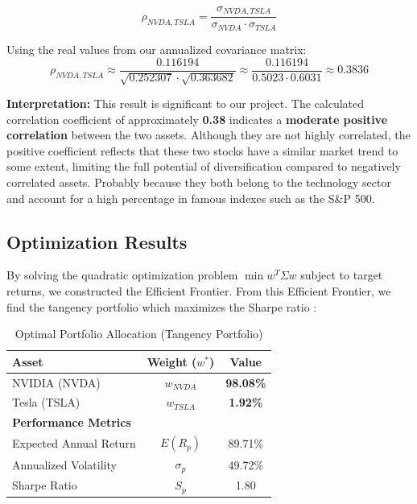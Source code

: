 \documentclass[12pt]{article}
\begin{document}
\[
\rho_{NVDA, TSLA} = \frac{\sigma_{NVDA, TSLA}}{\sigma_{NVDA} \cdot \sigma_{TSLA}}
\]

Using the real values from our annualized covariance matrix:
\[
\rho_{NVDA, TSLA} \approx \frac{0.116194}{\sqrt{0.252307} \cdot \sqrt{0.363682}} \approx \frac{0.116194}{0.5023 \cdot 0.6031} \approx \mathbf{0.3836}
\]

\textbf{Interpretation:}
This result is significant to our project. The calculated correlation coefficient of approximately \textbf{0.38} indicates a \textbf{moderate positive correlation} between the two assets. Although they are not highly correlated, the positive coefficient reflects that these two stocks have a similar market trend to some extent, limiting the full potential of diversification compared to negatively correlated assets. Probably because they both belong to the technology sector and account for a high percentage in famous indexes such as the S\&P 500.



\subsection{Optimization Results}
By solving the quadratic optimization problem $\min w^T \Sigma w$ subject to target returns, we constructed the Efficient Frontier. From this Efficient Frontier, we find the tangency portfolio which maximizes the Sharpe ratio :
\begin{table}[h]
    \centering
    \caption{Optimal Portfolio Allocation (Tangency Portfolio)}
    \begin{tabular}{lcc}
        \hline
        \textbf{Asset} & \textbf{Weight ($w^*$)} & \textbf{Value} \\
        \hline
        NVIDIA (NVDA) & $w_{NVDA}$ & \textbf{98.08\%} \\ 
        Tesla (TSLA) & $w_{TSLA}$ & \textbf{1.92\%} \\ 
        \hline
        \hline
        \textbf{Performance Metrics} & & \\
        \hline
        Expected Annual Return & $E(R_p)$ & 89.71\% \\ 
        Annualized Volatility & $\sigma_p$ & 49.72\% \\ 
        Sharpe Ratio & $S_p$ & 1.80 \\ %
        \hline
    \end{tabular}
    \label{tab:optimal_portfolio}
\end{table}
\end{document}
